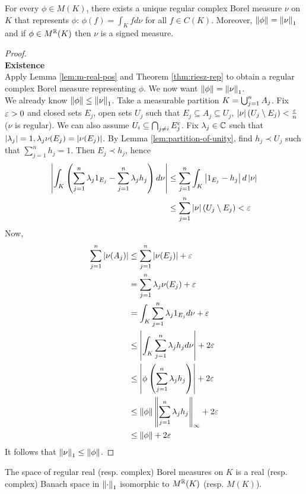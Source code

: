 \documentclass{article}
\begin{document}
\begin{ncor}
  For every $\phi \in M(K)$, there exists a unique regular complex Borel measure $\nu$ on $K$ that represents $\phi$: $\phi(f) = \int_K f d\nu$ for all $f \in C(K)$. Moreover, $\left\lVert \phi\right\rVert = \left\lVert \nu\right\rVert_1$ and if $\phi \in M^\mathbb R(K)$ then $\nu$ is a signed measure.
\end{ncor}
\begin{proof}~\\
  {\bf Existence} \\
  Apply Lemma \ref{lem:m-real-pos} and Theorem \ref{thm:riesz-rep} to obtain a regular complex Borel measure representing $\phi$. We now want $\left\lVert \phi\right\rVert = \left\lVert \nu\right\rVert_1$. \\
  We already know $\left\lVert \phi\right\rVert \le \left\lVert \nu\right\rVert_1$. Take a measurable partition $K = \bigcup_{j = 1}^n A_j$. Fix $\varepsilon > 0$ and closed sets $E_j$, open sets $U_j$ such that $E_j \subseteq A_j \subseteq U_j$, $\left\lvert \nu\right\rvert(U_j \setminus E_j) < \frac{\varepsilon} n$ ($\nu$ is regular). We can also assume $U_i \subseteq \bigcap_{j \ne i} E_j^c$. Fix $\lambda_j \in \mathbb C$ such that $\left\lvert \lambda_j\right\rvert = 1, \lambda_j\nu(E_j) = \left\lvert \nu(E_j)\right\rvert$. By Lemma \ref{lem:partition-of-unity}, find $h_j \prec U_j$ such that $\sum_{j = 1}^n h_j = 1$. Then $E_j \prec h_j$, hence
  \begin{align*}
    \left\lvert \int_K \left(\sum_{j = 1}^n \lambda_j 1_{E_j} - \sum_{j = 1}^n \lambda_jh_j\right) d\nu\right\rvert
    & \le \sum_{j = 1}^n \int_K \left\lvert 1_{E_j} - h_j\right\rvert d\left\lvert \nu\right\rvert \\
    & \le \sum_{j = 1}^n \left\lvert \nu\right\rvert(U_j \setminus E_j) < \varepsilon
  \end{align*}
  Now,
  \begin{align*}
    \sum_{j = 1}^n \left\lvert \nu(A_j)\right\rvert
    & \le \sum_{j = 1}^n \left\lvert \nu(E_j)\right\rvert + \varepsilon \\
    & = \sum_{j = 1}^n \lambda_j\nu(E_j) + \varepsilon \\
    & = \int_K \sum_{j = 1}^n \lambda_j1_{E_j} d\nu + \varepsilon \\
    & \le \left\lvert \int_K \sum_{j = 1}^n \lambda_jh_j d\nu\right\rvert + 2\varepsilon \\
    & \le \left\lvert \phi\left(\sum_{j = 1}^n \lambda_jh_j\right)\right\rvert + 2\varepsilon \\
    & \le \left\lVert \phi\right\rVert \left\lVert \sum_{j = 1}^n \lambda_jh_j\right\rVert_\infty + 2\varepsilon \\
    & \le \left\lVert \phi\right\rVert + 2\varepsilon
  \end{align*}
  It follows that $\left\lVert \nu\right\rVert_1 \le \left\lVert \phi\right\rVert$.
\end{proof}

\begin{ncor}
  The space of regular real (resp. complex) Borel measures on $K$ is a real (resp. complex) Banach space in $\left\lVert \cdot\right\rVert_1$ isomorphic to $M^\mathbb R(K)$ (resp. $M(K)$).
\end{ncor}
\end{document}
